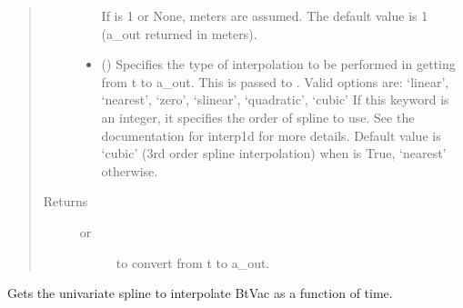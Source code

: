 \documentclass[letterpaper,10pt,english]{sphinxmanual}
\begin{document}
\begin{fulllineitems}
\begin{fulllineitems}
\begin{quote}
\begin{description}
\begin{itemize}
If  is 1 or None, meters are assumed. The default
value is 1 (a\_out returned in meters).


\item {} 
 () \textendash{} Specifies the type of interpolation to be performed in getting
from t to a\_out. This is passed to
. Valid options are:
‘linear’, ‘nearest’, ‘zero’, ‘slinear’, ‘quadratic’, ‘cubic’
If this keyword is an integer, it specifies the order of spline
to use. See the documentation for interp1d for more details.
Default value is ‘cubic’ (3rd order spline interpolation) when
 is True, ‘nearest’ otherwise.

\end{itemize}

\item[{Returns}] \leavevmode
\begin{description}
\item[{ or}] \leavevmode
{} to convert from t to a\_out.

\end{description}


\end{description}\end{quote}

\end{fulllineitems}


\begin{fulllineitems}
\label{\detokenize{eqtools:eqtools.core.Equilibrium.getBtVacSpline}}
Gets the univariate spline to interpolate BtVac as a function of time.


\end{fulllineitems}
\end{fulllineitems}
\end{document}
